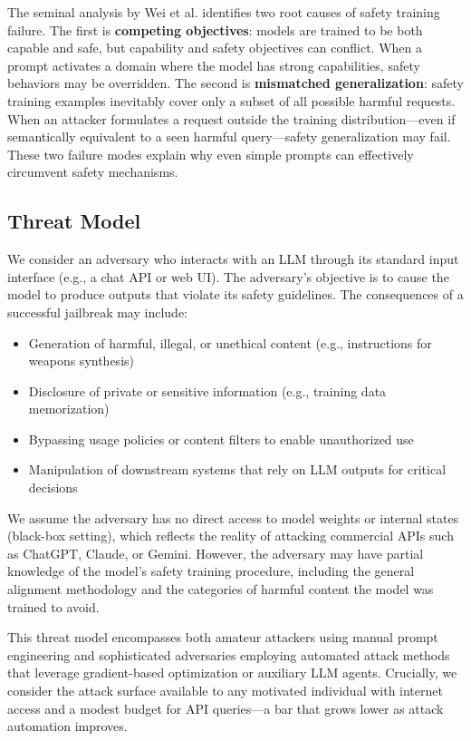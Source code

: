 \documentclass[conference]{IEEEtran}
\begin{document}
The seminal analysis by Wei et al. \cite{wei2023jailbroken} identifies two root causes of safety training failure. The first is \textbf{competing objectives}: models are trained to be both capable and safe, but capability and safety objectives can conflict. When a prompt activates a domain where the model has strong capabilities, safety behaviors may be overridden. The second is \textbf{mismatched generalization}: safety training examples inevitably cover only a subset of all possible harmful requests. When an attacker formulates a request outside the training distribution---even if semantically equivalent to a seen harmful query---safety generalization may fail. These two failure modes explain why even simple prompts can effectively circumvent safety mechanisms.

\subsection{Threat Model}

We consider an adversary who interacts with an LLM through its standard input interface (e.g., a chat API or web UI). The adversary's objective is to cause the model to produce outputs that violate its safety guidelines. The consequences of a successful jailbreak may include:
\begin{itemize}
    \item Generation of harmful, illegal, or unethical content (e.g., instructions for weapons synthesis)
    \item Disclosure of private or sensitive information (e.g., training data memorization)
    \item Bypassing usage policies or content filters to enable unauthorized use
    \item Manipulation of downstream systems that rely on LLM outputs for critical decisions
\end{itemize}

We assume the adversary has no direct access to model weights or internal states (black-box setting), which reflects the reality of attacking commercial APIs such as ChatGPT, Claude, or Gemini. However, the adversary may have partial knowledge of the model's safety training procedure, including the general alignment methodology and the categories of harmful content the model was trained to avoid.

This threat model encompasses both amateur attackers using manual prompt engineering and sophisticated adversaries employing automated attack methods that leverage gradient-based optimization or auxiliary LLM agents. Crucially, we consider the attack surface available to any motivated individual with internet access and a modest budget for API queries---a bar that grows lower as attack automation improves.
\end{document}
